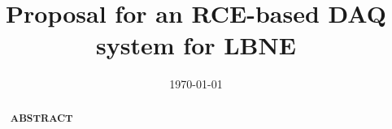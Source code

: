 \documentclass[prc,12pt]{revtex4}
\begin{document}

\title{\bf\large{Proposal for an RCE-based DAQ system for LBNE}}


\date{\today}

\begin{abstract}
\begin{centerline}
{\bf {\large ABSTRACT}}
\vspace{0.5cm}
\end{centerline}
\begin{singlespace}


\end{singlespace}
\end{abstract}

\maketitle
\clearpage












\end{document}
